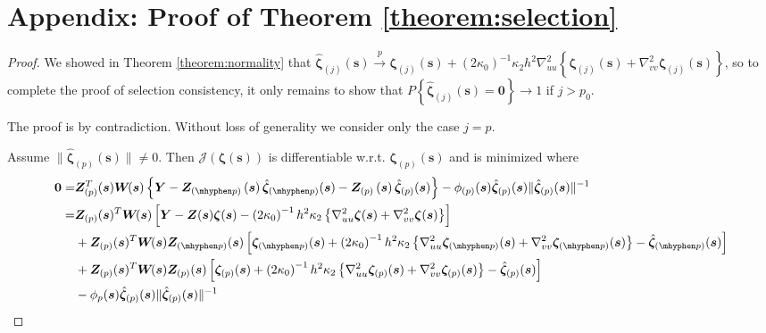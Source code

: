 \documentclass[authoryear,review, 12pt]{elsarticle}
\begin{document}
\section*{Appendix: Proof of Theorem \ref{theorem:selection}\label{sec:gaussian-selection-proof}}
\begin{proof}
We showed in Theorem \ref{theorem:normality} that $\hat{\bm{\zeta}}_{(j)}(\bm{s})\xrightarrow{p}\bm{\zeta}_{(j)}(\bm{s})+\left(2\kappa_{0}\right)^{-1}\kappa_{2}h^{2}\nabla_{uu}^{2}\left\{ \bm{\zeta}_{(j)}(\bm{s})+\nabla_{vv}^{2}\bm{\zeta}_{(j)}(\bm{s})\right\} $,
so to complete the proof of selection consistency, it only remains
to show that $P\left\{ \hat{\bm{\zeta}}_{(j)}(\bm{s})=\bm{0}\right\} \to1$
if $j>p_{0}$.

The proof is by contradiction. Without loss of generality we consider
only the case $j=p$.

Assume $\|\hat{\bm{\zeta}}_{(p)}(\bm{s})\|\ne0$. Then $\mathcal{J}\left(\bm{\zeta}(\bm{s})\right)$
is differentiable w.r.t. $\bm{\zeta}_{(p)}(\bm{s})$ and is minimized
where 
\begin{align*}
\bm{0}= & \bm{Z}_{(p)}^{T}(\bm{s})\bm{W}\!(\bm{s})\left\{ \bm{Y}-\bm{Z}_{(\mhyphen p)}\left(\bm{s}\right)\hat{\bm{\zeta}}_{(\mhyphen p)}(\bm{s})-\bm{Z}_{(p)}\left(\bm{s}\right)\hat{\bm{\zeta}}_{(p)}(\bm{s})\right\} -\phi_{(p)}(\bm{s})\hat{\bm{\zeta}}_{(p)}(\bm{s})\|\hat{\bm{\zeta}}_{(p)}(\bm{s})\|^{-1}\\
= & \bm{Z}_{(p)}(\bm{s})^{T}\bm{W}\!(\bm{s})\left[\bm{Y}-\bm{Z}(\bm{s})\bm{\zeta}(\bm{s})-\left(2\kappa_{0}\right)^{-1}h^{2}\kappa_{2}\left\{ \nabla_{uu}^{2}\bm{\zeta}(\bm{s})+\nabla_{vv}^{2}\bm{\zeta}(\bm{s})\right\} \right]\\
 & +\bm{Z}_{(p)}(\bm{s})^{T}\bm{W}\!(\bm{s})\bm{Z}_{(\mhyphen p)}(\bm{s})\left[\bm{\zeta}_{(\mhyphen p)}(\bm{s})+\left(2\kappa_{0}\right)^{-1}h^{2}\kappa_{2}\left\{ \nabla_{uu}^{2}\bm{\zeta}_{(\mhyphen p)}(\bm{s})+\nabla_{vv}^{2}\bm{\zeta}_{(\mhyphen p)}(\bm{s})\right\} -\hat{\bm{\zeta}}_{(\mhyphen p)}(\bm{s})\right]\\
 & +\bm{Z}_{(p)}(\bm{s})^{T}\bm{W}\!(\bm{s})\bm{Z}_{(p)}(\bm{s})\left[\bm{\zeta}_{(p)}(\bm{s})+\left(2\kappa_{0}\right)^{-1}h^{2}\kappa_{2}\left\{ \nabla_{uu}^{2}\bm{\zeta}_{(p)}(\bm{s})+\nabla_{vv}^{2}\bm{\zeta}_{(p)}(\bm{s})\right\} -\hat{\bm{\zeta}}_{(p)}(\bm{s})\right]\\
 & -\phi_{p}(\bm{s})\hat{\bm{\zeta}}_{(p)}(\bm{s})\|\hat{\bm{\zeta}}_{(p)}(\bm{s})\|^{-1}
\end{align*}



\end{proof}
\end{document}
